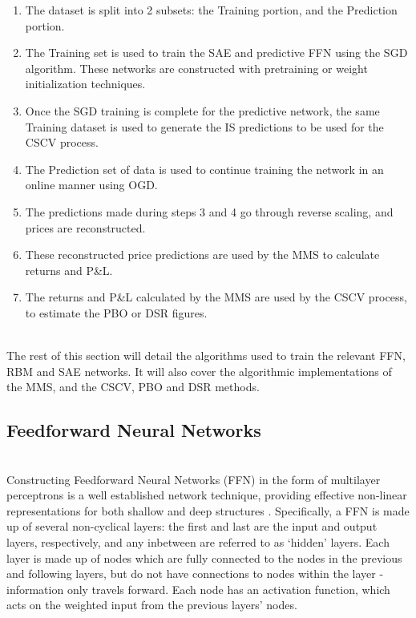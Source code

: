\documentclass[a4paper,11pt,oneside]{article}
\theoremstyle{plain}
\theoremstyle{definition}
\begin{document}
	\begin{enumerate}
		\item The dataset is split into 2 subsets: the Training portion, and the Prediction portion.
		\item The Training set is used to train the SAE and predictive FFN using the SGD algorithm. These networks are constructed with pretraining or weight initialization techniques.
		\item Once the SGD training is complete for the predictive network, the same Training dataset is used to generate the IS predictions to be used for the CSCV process.
		\item The Prediction set of data is used to continue training the network in an online manner using OGD.
		\item The predictions made during steps 3 and 4 go through reverse scaling, and prices are reconstructed.
		\item These reconstructed price predictions are used by the MMS to calculate returns and P\&L.
		\item The returns and P\&L calculated by the MMS are used by the CSCV process, to estimate the PBO or DSR figures.
	\end{enumerate}
	~\\
	The rest of this section will detail the algorithms used to train the relevant FFN, RBM and SAE networks. It will also cover the algorithmic implementations of the MMS, and the CSCV, PBO and DSR methods.
	
	\subsection{Feedforward Neural Networks}\label{imp_ffn}
	~\\
	Constructing Feedforward Neural Networks (FFN) in the form of multilayer perceptrons is a well established network technique, providing effective non-linear representations for both shallow and deep structures \citep{Schmidhuber}. Specifically, a FFN is made up of several non-cyclical layers: the first and last are the input and output layers, respectively, and any inbetween are referred to as `hidden' layers. Each layer is made up of nodes which are fully connected to the nodes in the previous and following layers, but do not have connections to nodes within the layer - information only travels forward. Each 
	node has an activation function, which acts on the weighted input from the previous layers' nodes.
	
\end{document}
